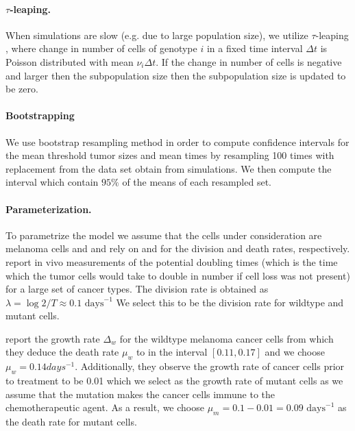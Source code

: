 \documentclass[12pt]{extarticle}
\begin{document}
\paragraph{$\tau$-leaping.}
When simulations are slow (e.g. due to large population size), we utilize $\tau$-leaping \citep{gillespie2001approximate}, where change in number of cells of genotype $i$ in a fixed time interval $\Delta t$ is Poisson distributed with mean $\nu_i\Delta t$.
If the change in number of cells is negative and larger then the subpopulation size then the subpopulation size is updated to be zero.


\paragraph{Bootstrapping}
We  use bootstrap resampling method in order to compute  confidence intervals for the mean threshold tumor sizes and mean times by resampling 100 times with replacement from the data set obtain from simulations. We then compute the interval which contain $95\%$ of the means of each resampled set.


\paragraph{Parameterization.}
To parametrize the model we assume that the cells under consideration are melanoma cells and and rely on \citep{rew2000cell} and \citep{bozic2013evolutionary} for the division and death rates, respectively. \citet{rew2000cell} report in vivo measurements of the potential doubling times (which is the time which the tumor cells would take to double in number if cell loss was not present) for a large set of cancer types.  The division rate is obtained as $\lambda=\log2/T\approx0.1\text{ days}^{-1}$ We select this to be the division rate for wildtype and mutant cells. %

\citet{bozic2013evolutionary} report the growth rate $\Delta_w$ for the wildtype melanoma cancer cells from which they deduce the death rate $\mu_w$ to in the interval $\left[0.11,0.17\right]$ and we choose $\mu_w=0.14days^{-1}$. Additionally, they observe the growth rate of cancer cells prior to treatment to be 0.01 which we select as the growth rate of mutant cells as we assume that the mutation makes the cancer cells immune to the chemotherapeutic agent. As a result, we choose $\mu_m=0.1-0.01=0.09\text{ days}^{-1}$ as the death rate for mutant cells.
\end{document}
